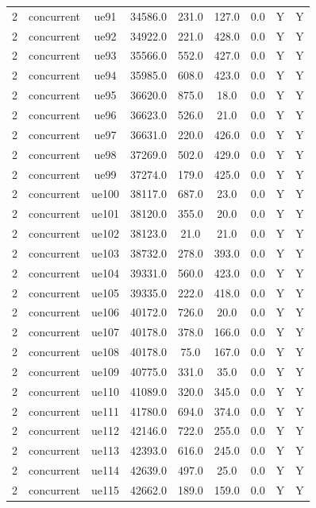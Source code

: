 \begin{table}[ht]
\begin{tabular}{|c|c|c|c|c|c|c|c|c|}
2 & concurrent & ue91 & 34586.0 & 231.0 & 127.0 & 0.0 & Y & Y \\
2 & concurrent & ue92 & 34922.0 & 221.0 & 428.0 & 0.0 & Y & Y \\
2 & concurrent & ue93 & 35566.0 & 552.0 & 427.0 & 0.0 & Y & Y \\
2 & concurrent & ue94 & 35985.0 & 608.0 & 423.0 & 0.0 & Y & Y \\
2 & concurrent & ue95 & 36620.0 & 875.0 & 18.0 & 0.0 & Y & Y \\
2 & concurrent & ue96 & 36623.0 & 526.0 & 21.0 & 0.0 & Y & Y \\
2 & concurrent & ue97 & 36631.0 & 220.0 & 426.0 & 0.0 & Y & Y \\
2 & concurrent & ue98 & 37269.0 & 502.0 & 429.0 & 0.0 & Y & Y \\
2 & concurrent & ue99 & 37274.0 & 179.0 & 425.0 & 0.0 & Y & Y \\
2 & concurrent & ue100 & 38117.0 & 687.0 & 23.0 & 0.0 & Y & Y \\
2 & concurrent & ue101 & 38120.0 & 355.0 & 20.0 & 0.0 & Y & Y \\
2 & concurrent & ue102 & 38123.0 & 21.0 & 21.0 & 0.0 & Y & Y \\
2 & concurrent & ue103 & 38732.0 & 278.0 & 393.0 & 0.0 & Y & Y \\
2 & concurrent & ue104 & 39331.0 & 560.0 & 423.0 & 0.0 & Y & Y \\
2 & concurrent & ue105 & 39335.0 & 222.0 & 418.0 & 0.0 & Y & Y \\
2 & concurrent & ue106 & 40172.0 & 726.0 & 20.0 & 0.0 & Y & Y \\
2 & concurrent & ue107 & 40178.0 & 378.0 & 166.0 & 0.0 & Y & Y \\
2 & concurrent & ue108 & 40178.0 & 75.0 & 167.0 & 0.0 & Y & Y \\
2 & concurrent & ue109 & 40775.0 & 331.0 & 35.0 & 0.0 & Y & Y \\
2 & concurrent & ue110 & 41089.0 & 320.0 & 345.0 & 0.0 & Y & Y \\
2 & concurrent & ue111 & 41780.0 & 694.0 & 374.0 & 0.0 & Y & Y \\
2 & concurrent & ue112 & 42146.0 & 722.0 & 255.0 & 0.0 & Y & Y \\
2 & concurrent & ue113 & 42393.0 & 616.0 & 245.0 & 0.0 & Y & Y \\
2 & concurrent & ue114 & 42639.0 & 497.0 & 25.0 & 0.0 & Y & Y \\
2 & concurrent & ue115 & 42662.0 & 189.0 & 159.0 & 0.0 & Y & Y \\

\end{tabular}
\end{table}
